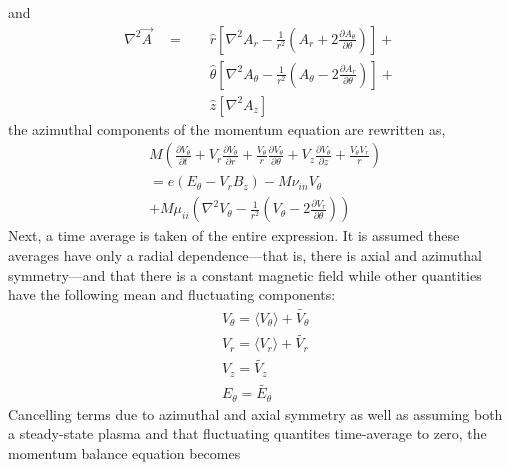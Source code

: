 \documentclass[aip,pop,amsmath,amssymb,preprint,superscriptaddress]{revtex4-1} %
\begin{document}
and
\begin{equation}
\begin{split}
\nabla^{2}\vec{A}\quad = &\quad \hat{r}\left[\nabla^{2}A_r-\frac{1}{r^2}\left(A_r+2\frac{\partial A_{\theta}}{\partial \theta}\right)\right]+\\
                    &\quad \hat{\theta}\left[\nabla^{2}A_{\theta}-\frac{1}{r^2}\left(A_{\theta}-2\frac{\partial A_r}{\partial \theta}\right)\right]+\\
                    &\quad \hat{z}\left[\nabla^{2}A_z\right]
\end{split}
\label{eq:cyllap}
\end{equation}
the azimuthal components of the momentum equation are rewritten as,
\begin{equation}
\begin{aligned}
&M\left(\frac{\partial V_{\theta}}{\partial t}+V_r\frac{\partial V_{\theta}}{\partial r}+\frac{V_{\theta}}{r}\frac{\partial V_{\theta}}{\partial \theta}+V_z\frac{\partial V_{\theta}}{\partial z}+\frac{V_{\theta}V_r}{r}\right)\\
&= e(E_{\theta}-V_{r}B_z)-M\nu_{in}V_{\theta}\\
&+M\mu_{ii}\left(\nabla^{2}V_{\theta}-\frac{1}{r^2}\left(V_{\theta}-2\frac{\partial V_r}{\partial \theta}\right)\right)
\end{aligned}
\label{eq:mombalance3}
\end{equation}
Next, a time average is taken of the entire expression. It is assumed these averages have only a radial dependence---that is, there is axial and azimuthal symmetry---and that there is a constant magnetic field while other quantities have the following mean and fluctuating components:
\begin{equation}
\begin{aligned}
&V_{\theta} = \langle V_{\theta}\rangle + \tilde{V_{\theta}}\\
&V_{r} = \langle V_{r}\rangle + \tilde{V_{r}}\\
&V_{z} = \tilde{V_{z}}\\
&E_{\theta} = \tilde{E_{\theta}}
\end{aligned}
\label{eq:flucsquant}
\end{equation}
Cancelling terms due to azimuthal and axial symmetry as well as assuming both a steady-state plasma and that fluctuating quantites time-average to zero, the momentum balance equation becomes
\end{document}
